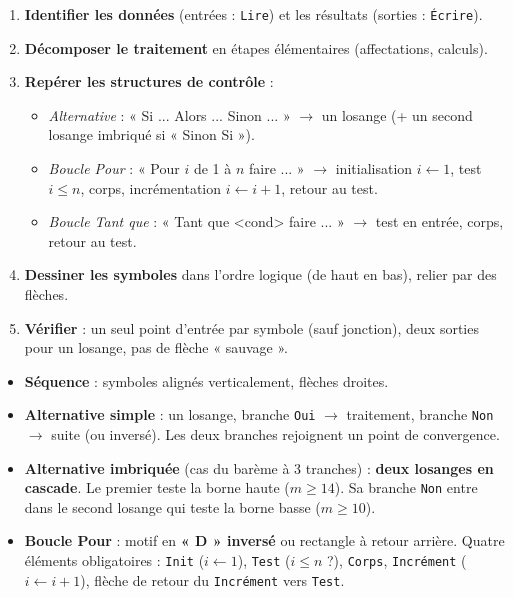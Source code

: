 \documentclass[11pt]{article}
\begin{document}
\begin{methode}
\begin{enumerate}
  \item \textbf{Identifier les données} (entrées : \texttt{Lire}) et les résultats (sorties : \texttt{Écrire}).
  \item \textbf{Décomposer le traitement} en étapes élémentaires (affectations, calculs).
  \item \textbf{Repérer les structures de contrôle} :
        \begin{itemize}
          \item \emph{Alternative} : « Si ... Alors ... Sinon ... » $\rightarrow$ un losange (+ un second losange imbriqué si « Sinon Si »).
          \item \emph{Boucle Pour} : « Pour $i$ de 1 à $n$ faire ... » $\rightarrow$ initialisation $i \leftarrow 1$, test $i \leq n$, corps, incrémentation $i \leftarrow i+1$, retour au test.
          \item \emph{Boucle Tant que} : « Tant que <cond> faire ... » $\rightarrow$ test en entrée, corps, retour au test.
        \end{itemize}
  \item \textbf{Dessiner les symboles} dans l'ordre logique (de haut en bas), relier par des flèches.
  \item \textbf{Vérifier} : un seul point d'entrée par symbole (sauf jonction), deux sorties pour un losange, pas de flèche « sauvage ».
\end{enumerate}
\end{methode}

\begin{aretenir}
\begin{itemize}
  \item \textbf{Séquence} : symboles alignés verticalement, flèches droites.
  \item \textbf{Alternative simple} : un losange, branche \texttt{Oui} $\rightarrow$ traitement, branche \texttt{Non} $\rightarrow$ suite (ou inversé). Les deux branches rejoignent un point de convergence.
  \item \textbf{Alternative imbriquée} (cas du barème à 3 tranches) : \textbf{deux losanges en cascade}. Le premier teste la borne haute ($m \geq 14$). Sa branche \texttt{Non} entre dans le second losange qui teste la borne basse ($m \geq 10$).
  \item \textbf{Boucle Pour} : motif en \textbf{« D » inversé} ou rectangle à retour arrière. Quatre éléments obligatoires : \texttt{Init} ($i \leftarrow 1$), \texttt{Test} ($i \leq n$ ?), \texttt{Corps}, \texttt{Incrément} ($i \leftarrow i+1$), flèche de retour du \texttt{Incrément} vers \texttt{Test}.
\end{itemize}
\end{aretenir}
\end{document}
